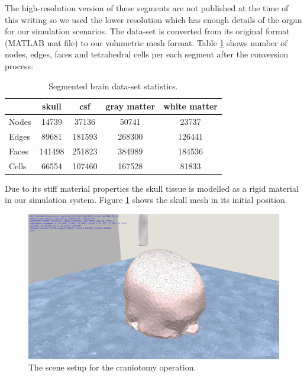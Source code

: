 The high-resolution version of these segments are not published at the time of this writing so we used the lower resolution 
which has enough details of the organ for our simulation scenarios. The data-set is converted from its original format 
(MATLAB mat file) to our volumetric mesh format. Table \ref{table:brainmesh} shows number of nodes, edges, faces and tetrahedral cells 
per each segment after the conversion process:

\begin{table}[H]
\begin{center}
\caption{\label{table:brainmesh}{Segmented brain data-set statistics.}}
  \begin{tabular}{ | l | c | c | c | c |}
    \hline    
     & skull & csf & gray matter & white matter \\ \hline \hline    
    Nodes & 14739 & 37136 & 50741 & 23737  \\ \hline
    Edges & 89681 & 181593 & 268300 & 126441 \\ \hline
    Faces & 141498 & 251823 & 384989 & 184536 \\ \hline
    Cells & 66554 & 107460 & 167528 & 81833 \\ \hline
    \hline
  \end{tabular}
\end{center}
\end{table}

Due to its stiff material properties the skull tissue is modelled as a rigid material in our simulation system. 
Figure \ref{fig:craniotomy01} shows the skull mesh in its initial position.

\begin{figure}[H]
  \centering
  \includegraphics[width=0.7\linewidth]{figures/evaluation/craniotomy01.png}
  \caption{\label{fig:craniotomy01}
  {The scene setup for the craniotomy operation.}
}
\end{figure}


